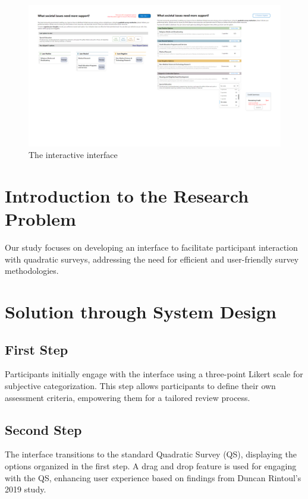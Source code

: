 \begin{figure}[h]
    \centering
    \includegraphics[width=1\textwidth]{content/image/interface.png}
    \caption{The interactive interface}
    \label{fig:interactiveInterface}
\end{figure}


\section{Introduction to the Research Problem}
Our study focuses on developing an interface to facilitate participant interaction with quadratic surveys, addressing the need for efficient and user-friendly survey methodologies.

\section{Solution through System Design}
\subsection{First Step}
Participants initially engage with the interface using a three-point Likert scale for subjective categorization. This step allows participants to define their own assessment criteria, empowering them for a tailored review process.

\subsection{Second Step}
The interface transitions to the standard Quadratic Survey (QS), displaying the options organized in the first step. A drag and drop feature is used for engaging with the QS, enhancing user experience based on findings from Duncan Rintoul's 2019 study.

